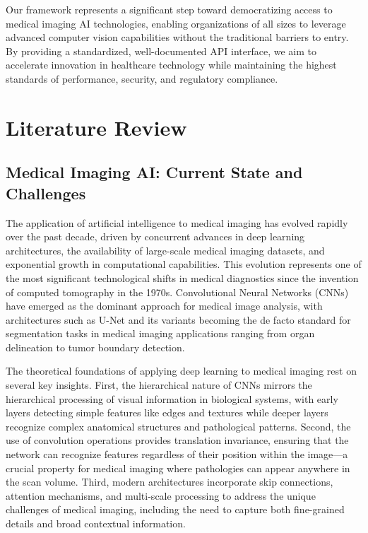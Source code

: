 \documentclass[12pt,a4paper]{article}
\begin{document}
Our framework represents a significant step toward democratizing access to medical imaging AI technologies, enabling organizations of all sizes to leverage advanced computer vision capabilities without the traditional barriers to entry. By providing a standardized, well-documented API interface, we aim to accelerate innovation in healthcare technology while maintaining the highest standards of performance, security, and regulatory compliance.

\section{Literature Review}

\subsection{Medical Imaging AI: Current State and Challenges}

The application of artificial intelligence to medical imaging has evolved rapidly over the past decade, driven by concurrent advances in deep learning architectures, the availability of large-scale medical imaging datasets, and exponential growth in computational capabilities. This evolution represents one of the most significant technological shifts in medical diagnostics since the invention of computed tomography in the 1970s. Convolutional Neural Networks (CNNs) have emerged as the dominant approach for medical image analysis, with architectures such as U-Net \cite{ronneberger2015unet} and its variants becoming the de facto standard for segmentation tasks in medical imaging applications ranging from organ delineation to tumor boundary detection.

The theoretical foundations of applying deep learning to medical imaging rest on several key insights. First, the hierarchical nature of CNNs mirrors the hierarchical processing of visual information in biological systems, with early layers detecting simple features like edges and textures while deeper layers recognize complex anatomical structures and pathological patterns. Second, the use of convolution operations provides translation invariance, ensuring that the network can recognize features regardless of their position within the image—a crucial property for medical imaging where pathologies can appear anywhere in the scan volume. Third, modern architectures incorporate skip connections, attention mechanisms, and multi-scale processing to address the unique challenges of medical imaging, including the need to capture both fine-grained details and broad contextual information.
\end{document}
